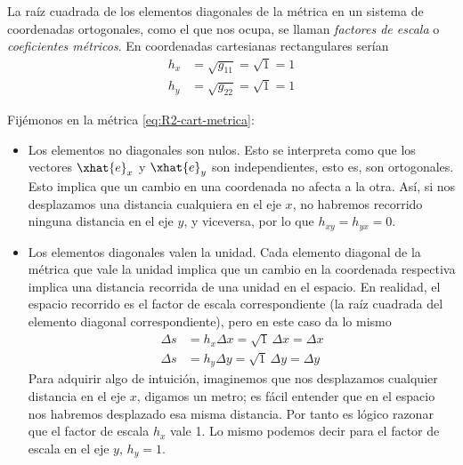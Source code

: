 La raíz cuadrada de los elementos diagonales de la métrica en un sistema de coordenadas ortogonales, como el que nos ocupa, se llaman \emph{factores de escala} o \emph{coeficientes métricos}. En coordenadas cartesianas rectangulares serían
\begin{align*}
  h_x &= \sqrt{g_{11}} = \sqrt{1} = 1\\
  h_y &= \sqrt{g_{22}} = \sqrt{1} = 1  
\end{align*}

Fijémonos en la métrica \eqref{eq:R2-cart-metrica}:
\begin{itemize}
\item Los elementos no diagonales son nulos. Esto se interpreta como que los vectores
  $\xhat{e}_x$ y $\xhat{e}_y$ son independientes, esto es, son ortogonales.
  Esto implica que un cambio en una coordenada no afecta a la otra. Así, si nos
  desplazamos una distancia cualquiera en el eje $x$, no habremos recorrido ninguna
  distancia en el eje $y$, y viceversa, por lo que $h_{xy}=h_{yx}=0$.
\item Los elementos diagonales valen la unidad. Cada elemento diagonal de la métrica que
  vale la unidad implica que un cambio en la coordenada respectiva implica una distancia
  recorrida de una unidad en el espacio. En realidad, el espacio recorrido es el factor
  de escala correspondiente (la raíz cuadrada del elemento diagonal correspondiente),
  pero en este caso da lo mismo
  \begin{subequations}
    \begin{align}
      \Delta s &= h_x \Delta x = \sqrt{1}\, \Delta x = \Delta x\\
      \Delta s &= h_y \Delta y = \sqrt{1}\, \Delta y = \Delta y
    \end{align}
  \end{subequations}
  Para adquirir algo de intuición, imaginemos que nos desplazamos cualquier distancia en
  el eje $x$, digamos un metro; es fácil entender que en el espacio nos habremos
  desplazado esa misma distancia. Por tanto es lógico razonar que el factor de escala
  $h_x$ vale 1. Lo mismo podemos decir para el factor de escala en el eje $y$, $h_y=1$.
\end{itemize}

